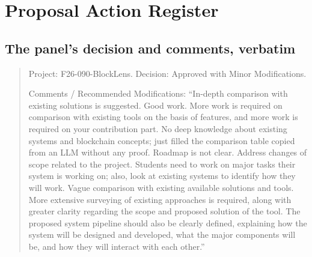 \chapter{Proposal Action Register}
\label{app:register}
\section{The panel's decision and comments, verbatim}
\begin{quote}\small
Project: F26-090-BlockLens. Decision: Approved with Minor Modifications.

Comments / Recommended Modifications: ``In-depth comparison with existing solutions is suggested. Good work. More work is required on comparison with existing tools on the basis of features, and more work is required on your contribution part. No deep knowledge about existing systems and blockchain concepts; just filled the comparison table copied from an LLM without any proof. Roadmap is not clear. Address changes of scope related to the project. Students need to work on major tasks their system is working on; also, look at existing systems to identify how they will work. Vague comparison with existing available solutions and tools. More extensive surveying of existing approaches is required, along with greater clarity regarding the scope and proposed solution of the tool. The proposed system pipeline should also be clearly defined, explaining how the system will be designed and developed, what the major components will be, and how they will interact with each other.''
\end{quote}
